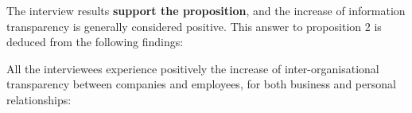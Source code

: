 The interview results {\bf support the proposition}, and the increase of information transparency is generally considered positive. This answer to proposition 2 is deduced from the following findings:

%
%
%
%
%
%
%
%


 All the interviewees experience positively the increase of inter-organisational transparency between companies and employees, for both business and personal relationships: 

